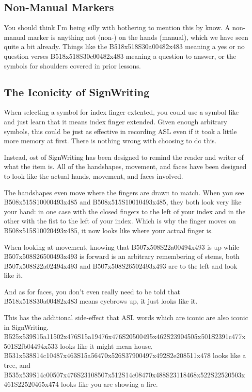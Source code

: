 \documentclass{article}
\begin{document}
\subsection{Non-Manual Markers}

You should think I'm being silly with bothering to mention this by know.
A non-manual marker is anything not (non-) on the hands (manual), which we have seen quite a bit already.
Things like the B518x518S30a00482x483 meaning a yes or no question verses B518x518S30c00482x483 meaning a question to answer, or the symbols for shoulders covered in prior lessons.

\subsection{The Iconicity of SignWriting}

When selecting a symbol for index finger extented, you could use a symbol like  and just learn that it means index finger extended.
Given enough arbitrary symbols, this could be just as effective in recording ASL even if it took a little more memory at first.
There is nothing wrong with choosing to do this.

Instead, ost of SignWriting has been designed to remind the reader and writer of what the item is.
All of the handshapes, movement, and faces have been designed to look like the actual hands, movement, and faces involved.

The handshapes even move where the fingers are drawn to match.
When you see B508x515S10000493x485 and B508x515S10010493x485, they both look very like your hand: in one case with the closed fingers to the left of your index and in the other with the fist to the left of your index.
Which is why the finger moves on B508x515S10020493x485, it now looks like where your actual finger is.

When looking at movement, knowing that B507x508S22a00494x493 is up while B507x508S26500493x493 is forward is an arbitrary remembering of stems, both B507x508S22a02494x493 and B507x508S26502493x493 are to the left and look like it.

And as for faces, you don't even really need to be told that B518x518S30a00482x483 means eyebrows up, it just looks like it.

This has the additional side-effect that ASL words which are iconic are also iconic in SignWriting.
B525x539S15a11502x476S15a19476x476S20500495x462S23904505x501S2391c477x501S2fb04494x533 looks like it might mean house, B531x538S14c10487x463S15a56470x526S37900497x492S2e208511x478 looks like a tree, and B535x539S14c00507x476S23108507x512S14c08470x488S23118468x522S22520503x461S22520465x474 looks like you are showing a fire.
\end{document}
